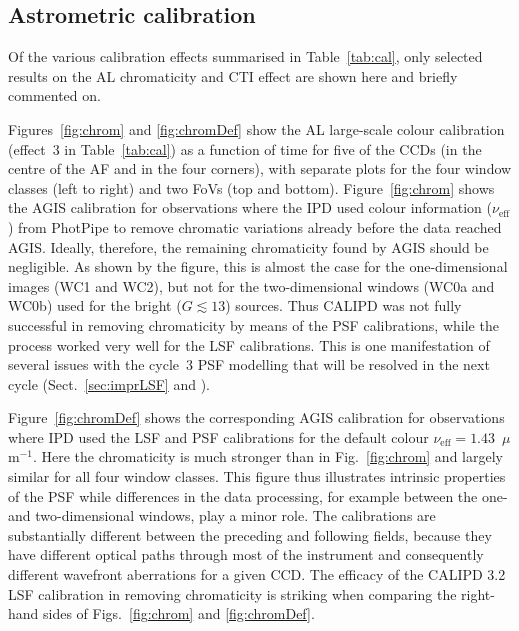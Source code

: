 \documentclass[longauth]{aa} %
\begin{document}
\subsection{Astrometric calibration}
\label{sec:calData}

Of the various calibration effects summarised in Table~\ref{tab:cal}, only selected results on 
the AL chromaticity and CTI effect are shown here and briefly commented on.

Figures~\ref{fig:chrom} and \ref{fig:chromDef} show the AL large-scale colour calibration 
(effect~3 in Table~\ref{tab:cal})
as a function of time for five of the CCDs (in the centre of the AF and in the four 
corners), with separate plots for the four window classes (left to right) and two FoVs (top and 
bottom). Figure~\ref{fig:chrom} shows the AGIS calibration for observations where the IPD used colour 
information ($\nu_\text{eff}$) from PhotPipe to remove chromatic variations already before the data 
reached AGIS. Ideally, therefore, the remaining chromaticity found by AGIS should be negligible. 
As shown by the figure, this is almost the case for the one-dimensional images (WC1 and WC2), but 
not for the two-dimensional windows (WC0a and WC0b) used for the bright ($G\lesssim 13$) sources. 
Thus CALIPD was not fully successful in removing chromaticity by means of the PSF calibrations,
while the process worked very well for the LSF calibrations. This is one manifestation of several issues 
with the cycle~3 PSF modelling that will be resolved in the next cycle (Sect.~\ref{sec:imprLSF}
and ).

Figure~\ref{fig:chromDef} shows the corresponding AGIS calibration for observations where IPD used 
the LSF and PSF calibrations for the default colour $\nu_\text{eff}=1.43$~$\mu$m$^{-1}$. Here the
chromaticity is much stronger than in Fig.~\ref{fig:chrom} and largely similar for all four window 
classes. This figure thus illustrates intrinsic properties of the PSF while differences in the data 
processing, for example between the one- and two-dimensional windows, play a minor role. 
The calibrations are substantially different between the preceding and following fields, because 
they have different optical paths through most of the instrument and consequently different 
wavefront aberrations for a given CCD. The efficacy of the CALIPD 3.2 LSF calibration in removing 
chromaticity is striking when comparing the right-hand sides of Figs.~\ref{fig:chrom} and \ref{fig:chromDef}.
\end{document}
